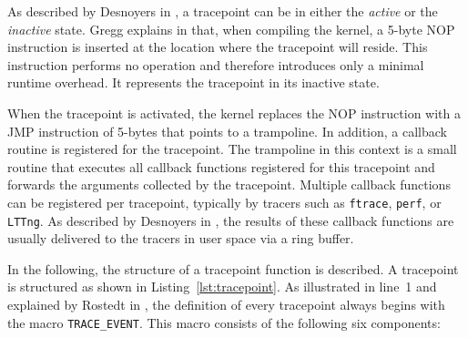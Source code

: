 As described by Desnoyers in \cite{tracepoints}, a tracepoint can be in either the \emph{active} or the \emph{inactive} state.  
Gregg explains in \cite[Chap. 2.9.2]{Gregg_2020} that, when compiling the kernel, a 5-byte NOP instruction is inserted at the location where the tracepoint will reside.  
This instruction performs no operation and therefore introduces only a minimal runtime overhead.  
It represents the tracepoint in its inactive state.  

When the tracepoint is activated, the kernel replaces the NOP instruction with a JMP instruction of 5-bytes that points to a trampoline.  
In addition, a callback routine is registered for the tracepoint.  
The trampoline in this context is a small routine that executes all callback functions registered for this tracepoint and forwards the arguments collected by the tracepoint.  
Multiple callback functions can be registered per tracepoint, typically by tracers such as \texttt{ftrace}, \texttt{perf}, or \texttt{LTTng}.  
As described by Desnoyers in \cite[p.~218]{Ecole23165}, the results of these callback functions are usually delivered to the tracers in user space via a ring buffer.  

In the following, the structure of a tracepoint function is described.  
A tracepoint is structured as shown in Listing~\ref{lst:tracepoint}.  
As illustrated in line~1 and explained by Rostedt in \cite{tracepoints_3}, the definition of every tracepoint always begins with the macro \texttt{TRACE\_EVENT}.  
This macro consists of the following six components:  

